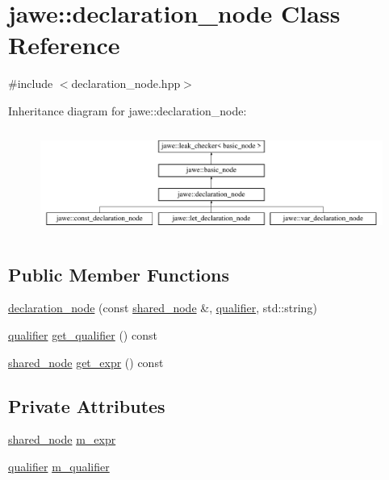\hypertarget{classjawe_1_1declaration__node}{}\section{jawe\+:\+:declaration\+\_\+node Class Reference}
\label{classjawe_1_1declaration__node}


{\ttfamily \#include $<$declaration\+\_\+node.\+hpp$>$}

Inheritance diagram for jawe\+:\+:declaration\+\_\+node\+:\begin{figure}[H]
\begin{center}
\leavevmode
\includegraphics[height=3.440860cm]{classjawe_1_1declaration__node}
\end{center}
\end{figure}
\subsection*{Public Member Functions}
\begin{DoxyCompactItemize}
\item 
\hyperlink{classjawe_1_1declaration__node_af927c96ffda696812f1abd3be57e7160}{declaration\+\_\+node} (const \hyperlink{namespacejawe_a3f307481d921b6cbb50cc8511fc2b544}{shared\+\_\+node} \&, \hyperlink{namespacejawe_aeebd1dfc752b79ba7f0483883a839a1e}{qualifier}, std\+::string)
\item 
\hyperlink{namespacejawe_aeebd1dfc752b79ba7f0483883a839a1e}{qualifier} \hyperlink{classjawe_1_1declaration__node_a55b9f60f34d212df4ee7e2a96a372d1f}{get\+\_\+qualifier} () const
\item 
\hyperlink{namespacejawe_a3f307481d921b6cbb50cc8511fc2b544}{shared\+\_\+node} \hyperlink{classjawe_1_1declaration__node_a8563061c0c3048adabb08cfcc9e0c83b}{get\+\_\+expr} () const
\end{DoxyCompactItemize}
\subsection*{Private Attributes}
\begin{DoxyCompactItemize}
\item 
\hyperlink{namespacejawe_a3f307481d921b6cbb50cc8511fc2b544}{shared\+\_\+node} \hyperlink{classjawe_1_1declaration__node_a07f4d07f9c057ae5ea2591894b447911}{m\+\_\+expr}
\item 
\hyperlink{namespacejawe_aeebd1dfc752b79ba7f0483883a839a1e}{qualifier} \hyperlink{classjawe_1_1declaration__node_aa5647d8c9d733c66d4a9d22486a3b026}{m\+\_\+qualifier}
\end{DoxyCompactItemize}

